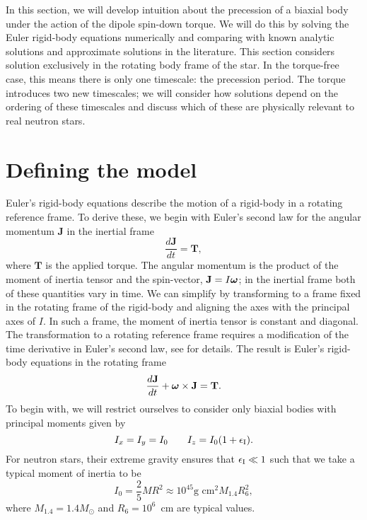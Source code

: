 \documentclass[../full_thesis/full_thesis.tex]{subfiles}
\begin{document}
In this section, we will develop intuition about the precession of a biaxial
body under the action of the \citet{Goldreich1970} dipole spin-down torque.  We
will do this by solving the Euler rigid-body equations numerically and
comparing with known analytic solutions and approximate solutions in the
literature. This section considers solution exclusively in the rotating body frame
of the star. In the torque-free case, this means there is only one timescale: the
precession period.  The torque introduces two new timescales; we will consider
how solutions depend on the ordering of these timescales and discuss which of
these are physically relevant to real neutron stars.

\section{Defining the model}
\label{sec: defining the model}

Euler's rigid-body equations describe the motion of a rigid-body in a rotating
reference frame. To derive these, we begin with Euler's second law for the
angular momentum $\mathbf{J}$ in the inertial frame
\begin{equation}
    \frac{d\mathbf{J}}{dt}=\mathbf{T},
\end{equation}
where $\mathbf{T}$ is the applied torque. The angular momentum is the product
of the moment of inertia tensor and the spin-vector, $\mathbf{J}=I \boldsymbol{\omega}$; in the inertial
frame both of these quantities vary in time. We can simplify by
transforming to a frame fixed in the rotating frame of the rigid-body and
aligning the axes with the principal axes of $I$. In such a frame, the moment
of inertia tensor is constant and diagonal. The transformation to a rotating reference
frame requires a modification of the time derivative in Euler's second law, see
\citet{Landau1969} for details. The result is Euler's rigid-body equations in
the rotating frame
\begin{equation}
    \frac{d\mathbf{J}}{dt} + \boldsymbol{\omega} \times \mathbf{J} = \mathbf{T}.
    \label{eqn: eom}
\end{equation}
To begin with, we will restrict ourselves to consider only biaxial bodies with
principal moments given by
\begin{equation}
I_{x} = I_{y} = I_{0} \;\;\;\;\;\;\; I_{z} = I_{0}(1+\epsilon_{\mathrm{I}}).
\end{equation}
For neutron stars, their extreme gravity ensures that $\epsilon_{\mathrm{I}} \ll 1$ such that
we take a typical moment of inertia to be
\begin{equation}
I_{0} = \frac{2}{5}MR^{2} \approx 10^{45}\textrm{g cm}^{2} M_{1.4}R_6^{2},
\end{equation}
where $M_{1.4} = 1.4 M_{\odot}$ and $R_6=10^{6}$~cm are typical values.
\end{document}
